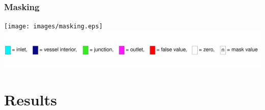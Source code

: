 \documentclass{beamer}
\begin{document}
\begin{frame}
	\frametitle{Masking}
	\texttt{[image: images/masking.eps]}
	\includegraphics[width=\textwidth]{images/legend.eps}
\end{frame}

\section{Results}
\end{document}
